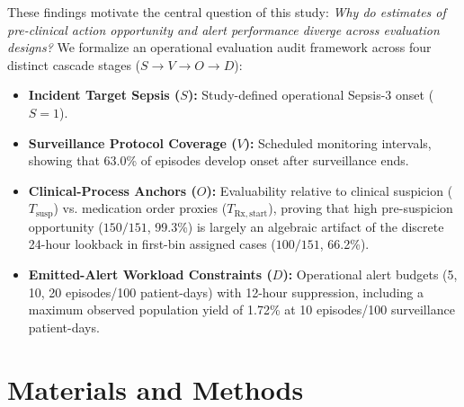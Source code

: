 \documentclass[12pt,a4paper]{article}
\begin{document}
These findings motivate the central question of this study: \textit{Why do estimates of pre-clinical action opportunity and alert performance diverge across evaluation designs?} We formalize an operational evaluation audit framework across four distinct cascade stages ($S \to V \to O \to D$):
\begin{itemize}
    \item \textbf{Incident Target Sepsis ($S$):} Study-defined operational Sepsis-3 onset ($S=1$).
    \item \textbf{Surveillance Protocol Coverage ($V$):} Scheduled monitoring intervals, showing that 63.0\% of episodes develop onset after surveillance ends.
    \item \textbf{Clinical-Process Anchors ($O$):} Evaluability relative to clinical suspicion ($T_{\mathrm{susp}}$) vs. medication order proxies ($T_{\mathrm{Rx,start}}$), proving that high pre-suspicion opportunity ($150/151$, 99.3\%) is largely an algebraic artifact of the discrete 24-hour lookback in first-bin assigned cases ($100/151$, 66.2\%).
    \item \textbf{Emitted-Alert Workload Constraints ($D$):} Operational alert budgets (5, 10, 20 episodes/100 patient-days) with 12-hour suppression, including a maximum observed population yield of 1.72\% at 10 episodes/100 surveillance patient-days.
\end{itemize}

\section{Materials and Methods}
\end{document}
